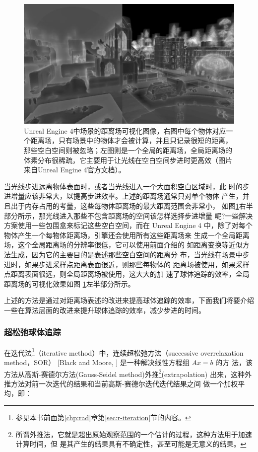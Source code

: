 \begin{figure}
	\includegraphics[width=\textwidth]{figures/df/DF_GlobalDF}
	\caption{Unreal Engine 4中场景的距离场可视化图像，右图中每个物体对应一个距离场，只有场景中的物体才会被计算，并且只记录很短的距离，那些空白空间则被忽略；左图则是一个全局的距离场，全局距离场的体素分布很稀疏，它主要用于让光线在空白空间步进时更高效（图片来自Unreal Engine 4官方文档）。}
	\label{f:df-DF_GlobalDF}
\end{figure}

当光线步进远离物体表面时，或者当光线进入一个大面积空白区域时，此 时的步进增量应该非常大，以提高步进效率。上述的距离场通常只对单个物体 产生，并且出于内存占用的考量，这些每物体距离场的最大距离范围会非常小， 如图\ref{f:df-DF_GlobalDF}右半部分所示，那光线进入那些不包含距离场的空间该怎样选择步进增量 呢?一些解决方案使用一些包围盒来标记这些空白空间，而在 Unreal Engine 4 中，除了对每个物体产生一个每物体距离场，引擎还会使用所有这些距离场来 生成一个全局距离场，这个全局距离场的分辨率很低，它可以使用前面介绍的 如距离变换等近似方法生成，因为它的主要目的是表述那些空白空间的距离分 布，当光线在场景中步进时，如果步进采样点距离表面很近，则那些每物体的 距离场被使用，如果采样点距离表面很远，则全局距离场被使用，这大大的加 速了球体追踪的效率，全局距离场的可视化效果如图 \ref{f:df-DF_GlobalDF}左半部分所示。

上述的方法是通过对距离场表述的改进来提高球体追踪的效率，下面我们将要介绍一些在算法层面的改进来提升球体追踪的效率，减少步进的时间。



\subsubsection{超松弛球体追踪}
在迭代法\footnote{参见本书前面第\ref{chp:rad}章第\ref{sec:r-iteration}节的内容。}（iterative method）中，连续超松弛方法（successive overrelaxation method，SOR）\cite{a:Successiveoverrelaxationmethod} [Black and Moore, ] 是一种解决线性方程组 $Ax = b$ 的方 法，该方法从高斯-赛德尔方法(Gauss-Seidel method)外推\footnote{所谓外推法，它就是超出原始观察范围的一个估计的过程，这种方法用于加速计算时间，但 是其产生的结果具有不确定性，甚至可能是无意义的结果。}(extrapolation) 出来，这种外推方法对前一次迭代的结果和当前高斯-赛德尔迭代迭代结果之间 做一个加权平均，即：


